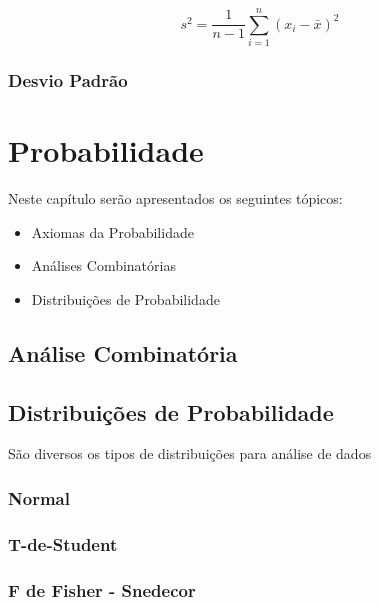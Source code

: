 \documentclass[
]{book}
\providecommand{\tightlist}{%
  \setlength{\itemsep}{0pt}\setlength{\parskip}{0pt}}
\begin{document}
\begin{equation}
s^2 =  \frac{1}{n-1}\sum_{i=1}^n(x_i - \bar{x})^2
\end{equation}

\hypertarget{desvio-padruxe3o}{%
\subsection{Desvio Padrão}\label{desvio-padruxe3o}}

\hypertarget{probabilidade}{%
\chapter{Probabilidade}\label{probabilidade}}

Neste capítulo serão apresentados os seguintes tópicos:

\begin{itemize}
\tightlist
\item
  Axiomas da Probabilidade
\item
  Análises Combinatórias
\item
  Distribuições de Probabilidade
\end{itemize}

\hypertarget{anuxe1lise-combinatuxf3ria}{%
\section{Análise Combinatória}\label{anuxe1lise-combinatuxf3ria}}

\hypertarget{distribuiuxe7uxf5es-de-probabilidade}{%
\section{Distribuições de Probabilidade}\label{distribuiuxe7uxf5es-de-probabilidade}}

São diversos os tipos de distribuições para análise de dados

\hypertarget{normal}{%
\subsection{Normal}\label{normal}}

\hypertarget{t-de-student}{%
\subsection{T-de-Student}\label{t-de-student}}

\hypertarget{f-de-fisher---snedecor}{%
\subsection{F de Fisher - Snedecor}\label{f-de-fisher---snedecor}}
\end{document}
